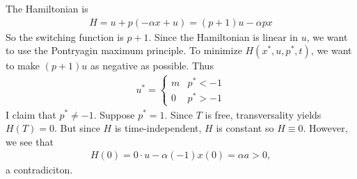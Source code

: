 \documentclass[12pt]{article}
\begin{document}
\begin{problem}[3]
The Hamiltonian is
 \begin{align*}
	H = u +p(- \alpha x+u) = (p+1)u - \alpha p x
\end{align*}
So the switching function is $ p+1$. Since the Hamiltonian is linear in $ u$, we want to use the Pontryagin maximum principle. To minimize $ H(x^* ,u,p^* ,t)$, we want to make  $ (p+1)u$ as negative as possible. Thus
 \begin{align*}
	u^* = \begin{cases}
		m & p^* <-1\\
		0& p^* >-1
	\end{cases}
\end{align*}
I claim that $ p^*  \neq -1$. Suppose $ p^* =1$. Since $ T$ is free, transversality yields  $ H(T) = 0$. But since  $ H$ is time-independent,  $ H$ is constant so  $ H \equiv 0$. However, we see that
 \begin{align*}
	H(0) = 0 \cdot u - \alpha (-1) x(0) = \alpha a >0,
\end{align*}
a contradiciton.


\end{problem}
\end{document}
